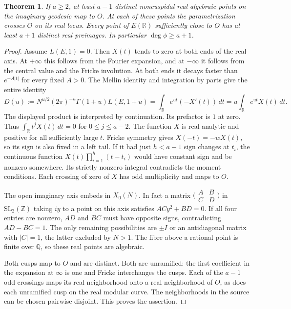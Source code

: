 \documentclass[11pt]{article}
\newtheorem{theorem}{Theorem}
\begin{document}
\begin{theorem}\label{th:fibre}
If $a\ge2$, at least $a-1$ distinct noncuspidal real algebraic points
on the imaginary geodesic map to $O$. At each of these points the
parametrization crosses $O$ on its real locus. Every point of
$E(\mathbb R)$ sufficiently close to $O$ has at least $a+1$ distinct
real preimages. In particular $\deg\phi\ge a+1$.
\end{theorem}
\begin{proof}
Assume $L(E,1)=0$. Then $X(t)$ tends to zero at both ends of the
real axis. At $+\infty$ this follows from the Fourier expansion,
and at $-\infty$ it follows from the central value and the Fricke
involution. At both ends it decays faster than $e^{-A|t|}$ for every
fixed $A>0$. The Mellin identity and integration by parts give the
entire identity
\[
 D(u):=N^{u/2}(2\pi)^{-u}\Gamma(1+u)L(E,1+u)
   =\int_{\mathbb R}e^{ut}(-X'(t))\,dt
   =u\int_{\mathbb R}e^{ut}X(t)\,dt .
\]
The displayed product is interpreted by continuation. Its prefactor
is $1$ at zero. Thus
$\int_{\mathbb R} t^jX(t)\,dt=0$ for $0\le j\le a-2$.
The function $X$ is real analytic and positive for all sufficiently
large $t$. Fricke symmetry gives $X(-t)=-wX(t)$, so its sign is also
fixed in a left tail. If it had just $h<a-1$ sign changes at $t_i$,
the continuous function $X(t)\prod_{i=1}^h(t-t_i)$ would have constant
sign and be nonzero somewhere. Its strictly nonzero integral
contradicts the moment conditions. Each crossing of zero of $X$ has
odd multiplicity and maps to $O$.

The open imaginary axis embeds in $X_0(N)$. In fact a matrix
$\bigl(\begin{smallmatrix}A&B\\ C&D\end{smallmatrix}\bigr)$ in
$\mathrm{SL}_2(\mathbb Z)$ taking $iy$ to a point on this axis
satisfies $AC y^2+BD=0$. If all four entries are nonzero, $AD$ and
$BC$ must have opposite signs, contradicting $AD-BC=1$. The only
remaining possibilities are $\pm I$ or an antidiagonal matrix with
$|C|=1$, the latter excluded by $N>1$. The fibre above a rational
point is finite over $\mathbb Q$, so these real points are algebraic.

Both cusps map to $O$ and are distinct. Both are unramified:
the first coefficient in the expansion at $\infty$ is one and
Fricke interchanges the cusps. Each of the $a-1$ odd crossings maps
its real neighborhood onto a real neighborhood of $O$, as does each
unramified cusp on the real modular curve. The neighborhoods in the
source can be chosen pairwise disjoint. This proves the assertion.
\end{proof}
\end{document}

